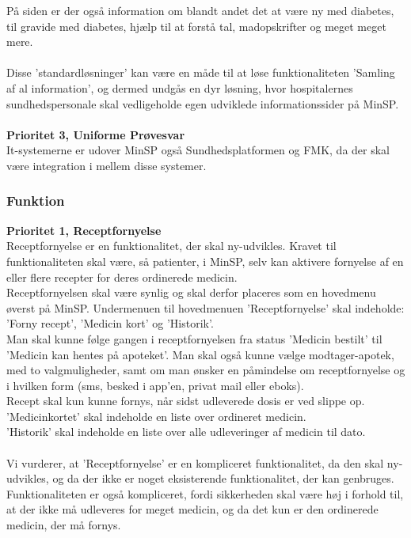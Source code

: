 På siden er der også information om blandt andet det at være ny med diabetes, til gravide med diabetes, hjælp til at forstå tal, madopskrifter og meget meget mere. 
\\ \\
Disse 'standardløsninger' kan være en måde til at løse funktionaliteten 'Samling af al information', og dermed undgås en dyr løsning, hvor hospitalernes sundhedspersonale skal vedligeholde egen udviklede informationssider på MinSP.
\\\\
\textbf{Prioritet 3, Uniforme Prøvesvar} \\
It-systemerne er udover MinSP også Sundhedsplatformen og FMK, da der skal være integration i mellem disse systemer.
\subsubsection{Funktion}  
\textbf{Prioritet 1, Receptfornyelse}\\
Receptfornyelse er en funktionalitet, der skal ny-udvikles. Kravet til funktionaliteten skal være, så patienter, i MinSP, selv kan aktivere fornyelse af en eller flere recepter for deres ordinerede medicin. 
\\
Receptfornyelsen skal være synlig og skal derfor placeres som en hovedmenu øverst på MinSP. Undermenuen til hovedmenuen 'Receptfornyelse' skal indeholde: 'Forny recept', 'Medicin kort' og 'Historik'.
\\
Man skal kunne følge gangen i receptfornyelsen fra status 'Medicin bestilt' til 'Medicin kan hentes på apoteket'. Man skal også kunne vælge modtager-apotek, med to valgmuligheder, samt om man ønsker en påmindelse om receptfornyelse og i hvilken form (sms, besked i app'en, privat mail eller eboks). 
\\ 
Recept skal kun kunne fornys, når sidst udleverede dosis er ved slippe op.  
\\
'Medicinkortet' skal indeholde en liste over ordineret medicin.\\ 
'Historik' skal indeholde en liste over alle udleveringer af medicin til dato.
\\ \\
Vi vurderer, at 'Receptfornyelse' er en kompliceret funktionalitet, da den skal ny-udvikles, og da der ikke er noget eksisterende funktionalitet, der kan genbruges. Funktionaliteten er også kompliceret, fordi sikkerheden skal være høj i forhold til, at der ikke må udleveres for meget medicin, og da det kun er den ordinerede medicin, der må fornys. \\

